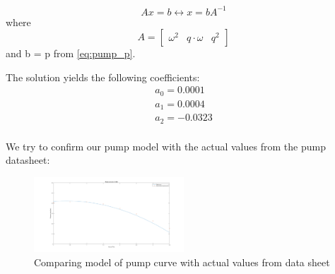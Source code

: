 \begin{equation}
	Ax = b \leftrightarrow x = bA^{-1}
\end{equation}
where 
\begin{equation}
	A = \begin{bmatrix}
			\omega^2 & q \cdot \omega & q^2
			\end{bmatrix}
\end{equation}
and b = p from \cref{eq:pump_p}.

The solution yields the following coefficients:
\begin{equation}
	\begin{split}
		a_0 = 0.0001 \\
		a_1 = 0.0004 \\
		a_2 = -0.0323 \\
	\end{split}
\end{equation}

We try to confirm our pump model with the actual values from the pump datasheet:

\begin{figure}[h!]
	\centering
	\includegraphics[width=0.5\textwidth]{Pictures/Pumpcurve_69.png}
	\caption{Comparing model of pump curve with actual values from data sheet}
	\label{fig:Pumpcurve_69}
\end{figure}








